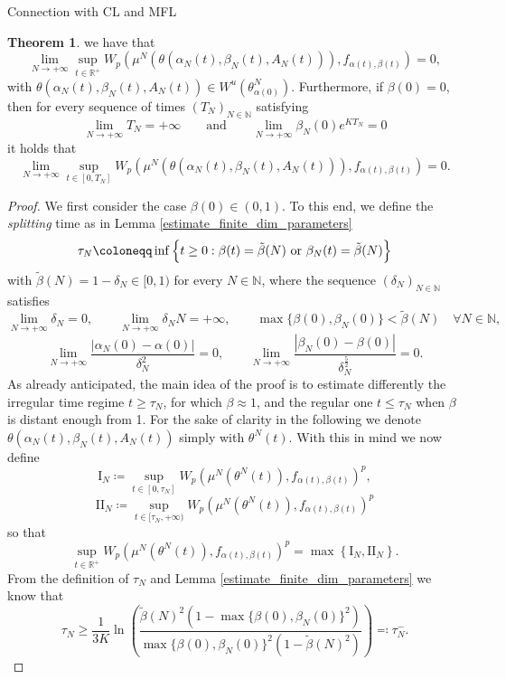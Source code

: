 \documentclass{article}
\theoremstyle{definition}
\newtheorem{theorem}[definition]{Theorem}
\renewcommand{\inf}{\mathop{\mathrm{inf}\vphantom{\mathrm{sup}}}}
\newcommand{\R}{\mathbb{R}}
\newcommand{\N}{\mathbb{N}}
\begin{document}
\begin{section}{Connection with CL and MFL}
\begin{theorem}
we have that
\begin{equation}\label{uniform_MFL_eq}
    \lim_{N\rightarrow+\infty}\sup_{t\in\R^+}W_p\left(\mu^N\left(\theta(\alpha_N(t),\beta_N(t),A_N(t))\right),f_{\alpha(t),\beta(t)}\right)=0,
\end{equation}
with $\theta(\alpha_N(t),\beta_N(t),A_N(t))\in W^u\left(\theta_{\alpha(0)}^N\right)$. Furthermore, if $\beta(0)=0$, then for every sequence of times $(T_N)_{N\in\N}$ satisfying
$$\lim_{N\rightarrow+\infty}T_N=+\infty\qquad\text{and}\qquad\lim_{N\rightarrow+\infty}\beta_N(0)e^{KT_N}=0$$
it holds that
\begin{equation}\label{long-time_behaviour}
    \lim_{N\rightarrow+\infty}\sup_{t\in[0,T_N]}W_p\left(\mu^N\left(\theta(\alpha_N(t),\beta_N(t),A_N(t))\right),f_{\alpha(t),\beta(t)}\right)=0.
\end{equation}
\end{theorem}
\begin{proof}
    We first consider the case $\beta(0)\in(0,1)$. To this end, we define the \textit{splitting} time as in Lemma \ref{estimate_finite_dim_parameters}
    $$\tau_N\coloneqq \inf\Big\{ t\geq0: \beta(t)=\Tilde{\beta}(N) \ \text{or}\ \beta_N(t)=\Tilde{\beta}(N) \Big\}$$
    with $\tilde{\beta}(N)=1-\delta_N\in[0,1)$ for every $N\in\mathbb{N}$, where the sequence $(\delta_N)_{N\in\mathbb{N}}$ satisfies
    $$\lim_{N\rightarrow+\infty}\delta_N=0, \qquad\lim_{N\rightarrow+\infty}\delta_NN=+\infty,\qquad\max\{\beta(0),\beta_N(0)\}<\tilde{\beta}(N) \quad\forall N\in\N,$$
    $$\lim_{N\rightarrow+\infty}\frac{|\alpha_N(0)-\alpha(0)|}{\delta_N^2}=0, \qquad\lim_{N\rightarrow+\infty}\frac{|\beta_N(0)-\beta(0)|}{\delta_N^{\frac{5}{2}}}=0.$$
    As already anticipated, the main idea of the proof is to estimate differently the irregular time regime $t\geq \tau_N$, for which $\beta\approx1$, and the regular one $t\leq \tau_N$ when $\beta$ is distant enough from 1. For the sake of clarity in the following we denote $\theta(\alpha_N(t),\beta_N(t),A_N(t))$ simply with $\theta^N(t)$. With this in mind we now define
$$\mathrm{I}_N\coloneqq\sup_{t\in[0,\tau_N]}W_p\left(\mu^N\left(\theta^N(t)\right),f_{\alpha(t),\beta(t)}\right)^p,$$
$$\mathrm{II}_N\coloneqq\sup_{t\in[\tau_N,+\infty)}W_p\left(\mu^N\left(\theta^N(t)\right),f_{\alpha(t),\beta(t)}\right)^p$$
    so that $$\sup_{t\in\R^+}W_p\left(\mu^N\left(\theta^N(t)\right),f_{\alpha(t),\beta(t)}\right)^p=\max\left\{\mathrm{I}_N,\mathrm{II}_N\right\}.$$
    From the definition of $\tau_N$ and Lemma \ref{estimate_finite_dim_parameters} we know that
    $$\tau_N\geq\frac{1}{3K}\ln\left(\frac{\tilde{\beta}(N)^2\left(1-\max\{\beta(0),\beta_N(0)\}^2\right)}{\max\{\beta(0),\beta_N(0)\}^2(1-\tilde{\beta}(N)^2)}\right)\eqqcolon\tau_N^-.$$

\end{proof}
\end{section}
\end{document}
